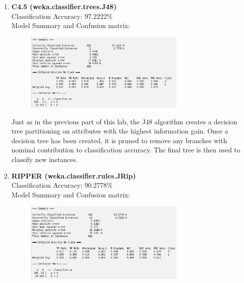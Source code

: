 \documentclass{article}
\begin{document}
    \begin{enumerate}[label = (\alph*), left=10pt, itemsep=10pt]
        
        \item \begin{minipage}[t]{0.9\textwidth}
            \textbf{C4.5 (weka.classifier.trees.J48)}\\
             Classification Accuracy: 97.2222\%\\
             Model Summary and Confusion matrix:
             \begin{figure}[H]
                \includegraphics[width=0.75\textwidth, height=0.25\textheight]{./6a2.png}
            \end{figure}
            Just as in the previous part of this lab, the J48 algorithm creates a decision tree partitioning
            on attributes with the highest information gain. Once a decision tree has been created, it is pruned
            to remove any branches with nominal contribution to classification accuracy. The final tree 
            is then used to classify new instances. 
        \end{minipage}
        \item \begin{minipage}[t]{0.9\textwidth}
            \textbf{RIPPER (weka.classifier.rules.JRip)}\\
             Classification Accuracy: 90.2778\%\\
             Model Summary and Confusion matrix:
             \begin{figure}[H]
                \includegraphics[width=0.75\textwidth, height=0.25\textheight]{./6b2.png}

\end{figure}
\end{minipage}
\end{enumerate}
\end{document}
